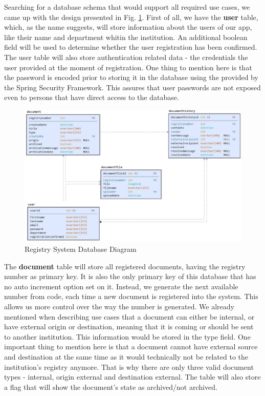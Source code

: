 Searching for a database schema that would support all required use cases, we came up with the design presented in Fig. \ref{db}. First of all, we have the \textbf{user} table, which, as the name suggests, will store information about the users of our app, like their name and department whitin the institution. An additional boolean field will be used to determine whether the user registration has been confirmed. The user table will also store authentication related data - the credentials the user provided at the moment of registration. One thing to mention here is that the password is encoded prior to storing it in the database using the  provided by the Spring Security Framework. This assures that user passwords are not exposed even to persons that have direct access to the database.

\begin{figure}[H]
    \centering
    \includegraphics[width=6in]{images/db}
    \caption{Registry System Database Diagram}
    \label{db}
\end{figure}

The \textbf{document} table will store all registered documents, having the registry number as primary key. It is also the only primary key of this database that has no auto increment option set on it. Instead, we generate the next available number from code, each time a new document is registered into the system. This allows us more control over the way the number is generated. We already mentioned when describing use cases that a document can either be internal, or have external origin or destination, meaning that it is coming or should be sent to another institution. This information would be stored in the type field. One important thing to mention here is that a document cannot have external source and destination at the same time as it would technically not be related to the institution's registry anymore. That is why there are only three valid document types - internal, origin external and destination external. The table will also store a flag that will show the document's state as archived/not archived.

